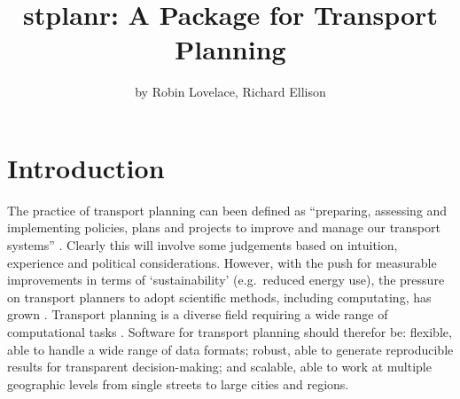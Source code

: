 \title{stplanr: A Package for Transport Planning}
\author{by Robin Lovelace, Richard Ellison}

\maketitle


\section{Introduction}\label{introduction}

The practice of transport planning can been defined as ``preparing,
assessing and implementing policies, plans and projects to improve and
manage our transport systems'' \citep{jones_road_2014}. Clearly this
will involve some judgements based on intuition, experience and
political considerations. However, with the push for measurable
improvements in terms of `sustainability' (e.g.~reduced energy use), the
pressure on transport planners to adopt scientific methods, including
computating, has grown \citep{balmer_matsim-t:_2009}. Transport planning
is a diverse field requiring a wide range of computational tasks
\citep{boyce_forecasting_2015}. Software for transport planning should
therefor be: flexible, able to handle a wide range of data formats;
robust, able to generate reproducible results for transparent
decision-making; and scalable, able to work at multiple geographic
levels from single streets to large cities and regions.

